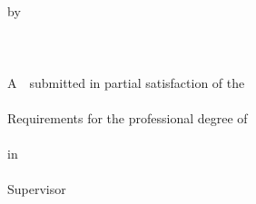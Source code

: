 {\begin{titlepage}
\begin{center}
  \qquad\\
  \qquad\\
  \begin{spacing}{2}
  \xiaosi
  by\\
  \@ename \\

  \qquad\\
  \@cbe\\
  A~\@cdegree~submitted in partial satisfaction of the\\

  \qquad\\
  Requirements for the professional degree of\\
  \@cclass\\

  \vspace{4\baselineskip}
  in\\
  \@ehnu\\
  Supervisor\\
  \@elevel~~ \@esupervisor\\
  \@edate
  \end{spacing}
\end{center}

\end{titlepage}



%

\clearpage{\thispagestyle{empty}\cleardoublepage}  %
\thispagestyle{empty} %

}

